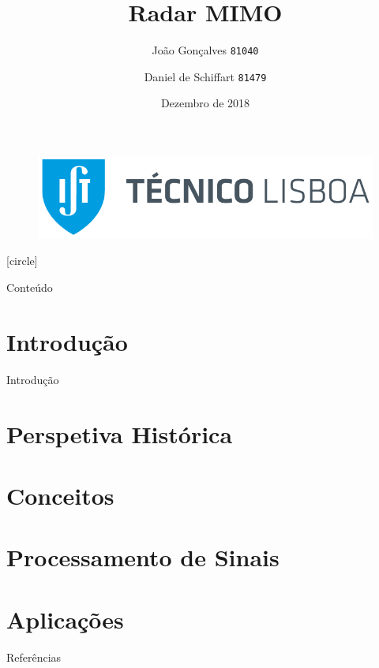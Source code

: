 \documentclass[portuguese]{beamer}
\title[Radar MIMO]{Radar MIMO}
\author[MEAer -- Sistemas de Radar]{
  João Gonçalves \texttt{81040} \and Daniel de Schiffart \texttt{81479} 
    }
\institute{Sistemas de Radar}
\date{Dezembro de 2018}
\begin{document}
\begin{frame}
    \begin{figure}
	\includegraphics[width=0.5\linewidth]{graphics/tecnico_logo.png}
    \end{figure}
    \titlepage
\end{frame}
[circle]
\begin{frame}{Conteúdo}
  \tableofcontents
\end{frame}

\section{Introdução}

\begin{frame}{Introdução}
  
\end{frame}

\section{Perspetiva Histórica}

\section{Conceitos}

\section{Processamento de Sinais}

\section{Aplicações}

\begin{frame}{Referências}
  \printbibliography
\end{frame}
\end{document}
